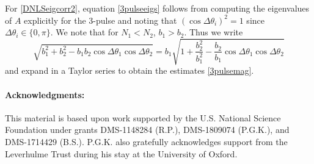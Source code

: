 \documentclass[12pt]{elsarticle}
\begin{document}
For \cref{DNLSeigcorr2}, equation \cref{3pulseeigs} follows from computing the eigenvalues of $A$ explicitly for the 3-pulse and noting that $(\cos \Delta \theta_i)^2 = 1$ since $\Delta \theta_i \in \{0, \pi\}$. We note that for $N_1 < N_2$, $b_1 > b_2$. Thus we write
\[
\sqrt{b_1^2 + b_2^2 - b_1 b_2\cos\Delta\theta_1 \cos\Delta\theta_2} = b_1
\sqrt{1 + \frac{b_2^2}{b_1^2} - \frac{b_2}{b_1} \cos\Delta\theta_1 \cos\Delta\theta_2} 
\]
and expand in a Taylor series to obtain the estimates \cref{3pulsemag}.

\paragraph{Acknowledgments:}

This material is based upon work supported by the U.S. National Science Foundation under grants DMS-1148284 (R.P.), DMS-1809074 (P.G.K.), and DMS-1714429 (B.S.). P.G.K. also gratefully acknowledges support from the Leverhulme
Trust during his stay at the University of Oxford.



\end{document}
